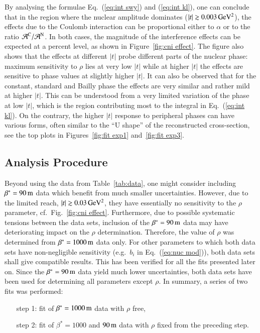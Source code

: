 By analysing the formulae Eq.~(\ref{eq:int swy}) and (\ref{eq:int kl}), one can conclude that in the region where the nuclear amplitude dominates ($|t| \gtrsim 0.003\,{\rm GeV^2}$), the effects due to the Coulomb interaction can be proportional either to $\alpha$ or to the ratio ${\cal A}^{\rm C} / {\cal A}^{\rm N}$. In both cases, the magnitude of the interference effects can be expected at a percent level, as shown in Figure~\ref{fig:cni effect}. The figure also shows that the effects at different $|t|$ probe different parts of the nuclear phase: maximum sensitivity to $\rho$ lies at very low $|t|$ while at higher $|t|$ the effects are sensitive to phase values at slightly higher $|t|$. It can also be observed that for the constant, standard and Bailly phase the effects are very similar and rather mild at higher $|t|$. This can be understood from a very limited variation of the phase at low $|t|$, which is the region contributing most to the integral in Eq.~(\ref{eq:int kl}). On the contrary, the higher $|t|$ response to peripheral phases can have various forms, often similar to the ``U shape'' of the reconstructed cross-section, see the top plots in Figures~\ref{fig:fit exp1} and~\ref{fig:fit exp3}.


\subsection{Analysis Procedure}
\label{sec:cni anal proc}

Beyond using the data from Table~\ref{tab:data}, one might consider including $\beta^* = 90\,{\rm m}$ data \cite{8tev-90m} which benefit from much smaller uncertainties. However, due to the limited reach, $|t| \gtrsim 0.03\,{\rm GeV^2}$, they have essentially no sensitivity to the $\rho$ parameter, cf.~Fig.~\ref{fig:cni effect}. Furthermore, due to possible systematic tensions between the data sets, inclusion of the $\beta^* = 90\,{\rm m}$ data may have deteriorating impact on the $\rho$ determination. Therefore, the value of $\rho$ was determined from $\beta^* = 1000\,{\rm m}$ data only. For other parameters to which both data sets have non-negligible sensitivity (e.g.~$b_i$ in Eq.~(\ref{eq:nuc mod})), both data sets shall give compatible results. This has been verified for all the fits presented later on. Since the $\beta^* = 90\,{\rm m}$ data yield much lower uncertainties, both data sets have been used for determining all parameters except $\rho$. In summary, a series of two fits was performed:
\begin{enumerate}[leftmargin=2cm]
\item[step 1:] fit of $\beta^* = 1000\,{\rm m}$ data with $\rho$ free,
\item[step 2:] fit of $\beta^* = 1000$ and $90\,{\rm m}$ data with $\rho$ fixed from the preceding step.
\end{enumerate}

